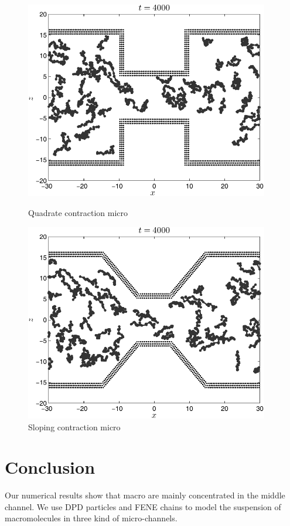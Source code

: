 \documentclass[12pt]{article}
\begin{document}
\begin{figure}[htb]
\begin{minipage}[t]{0.48\textwidth}
\centering
\includegraphics[width=0.95\textwidth]{chainT4000s}
\caption{Quadrate contraction micro}\label{fig:quad}
\end{minipage}
\begin{minipage}[t]{0.48\textwidth}
\centering
\includegraphics[width=0.95\textwidth]{chainY4000s}
\caption{Sloping contraction micro}\label{fig:slop}
\end{minipage}
\end{figure}

\section{Conclusion}
Our numerical results show that macro are mainly concentrated in the middle channel. We use DPD particles and FENE chains to model the suspension of macromolecules in three kind of micro-channels. 
\end{document}
